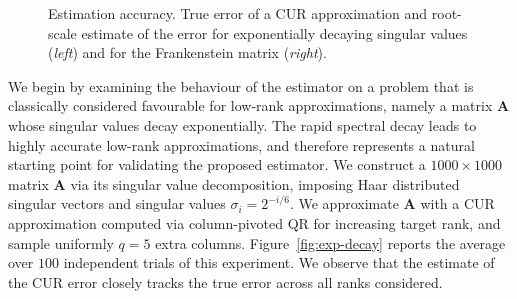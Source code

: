 \documentclass[11pt]{article}
\newenvironment{subfigure}[2][]{\begin{minipage}{#2}\refstepcounter{subfigure}\def\caption##1{\par\smallskip\centering\textbf{(\alph{subfigure})}~##1\par}}{\end{minipage}}
\begin{document}
\begin{figure}
\begin{subfigure}{0.48\textwidth}
{
}
        \caption{Frankenstein.}
        \label{fig:frankestein}
    \end{subfigure}
    \caption{Estimation accuracy. True error of a CUR approximation and root-scale estimate of the error for exponentially decaying singular values (\textit{left}) and for the Frankenstein matrix (\textit{right}).}
    \label{fig:quality1}
\end{figure}
We begin by examining the behaviour of the estimator on a problem that is classically considered favourable for low-rank approximations,
namely a matrix $\mathbf{A}$ whose singular values decay exponentially.
The rapid spectral decay leads to highly accurate low-rank approximations,
and therefore represents a natural starting point for validating the proposed estimator.
We construct a $1000 \times 1000$ matrix $\mathbf{A}$ via its singular value decomposition,
imposing Haar distributed singular vectors and singular values $\sigma_i = 2^{-i/6}$.
We approximate $\mathbf{A}$ with a CUR approximation computed via column-pivoted QR for increasing target rank, and sample uniformly $q = 5$ extra columns.
Figure~\ref{fig:exp-decay} reports the average over $100$ independent trials of this experiment.
We observe that the estimate of the CUR error closely tracks the true error across all ranks considered.
\end{document}
